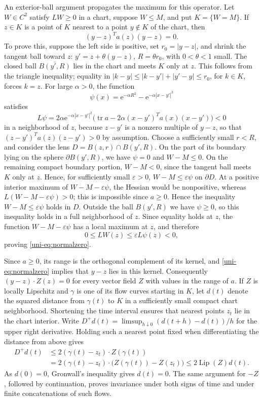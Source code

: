 An exterior-ball argument propagates the maximum for this operator.  Let $W\in C^2$
satisfy $LW\geq0$ in a chart, suppose $W\leq M$, and put
$K=\{W=M\}$.  If $z\in K$ is a point of $K$ nearest to a point $y\notin K$ of the chart, then
\begin{equation}\label{uni-eq:normalzero}
 (y-z)^Ta(z)(y-z)=0.
\end{equation}
To prove this, suppose the left side is positive, set
$r_0=|y-z|$, and shrink the tangent ball toward $z$:
$y'=z+\theta(y-z)$, $R=\theta r_0$, with $0<\theta<1$ small.
The closed ball $\overline{B(y',R)}$ lies in the chart and meets $K$
only at $z$.  This follows from the triangle inequality; equality in
$|k-y|\leq|k-y'|+|y'-y|\leq r_0$, for $k\in K$, forces $k=z$.
For large $\alpha>0$, the function
\[
 \psi(x)=\mathrm{e}^{-\alpha R^2}-\mathrm{e}^{-\alpha|x-y'|^2}
\]
satisfies
\[
 L\psi=2\alpha \mathrm{e}^{-\alpha|x-y'|^2}
   \bigl(\operatorname{tr}a-2\alpha(x-y')^Ta(x)(x-y')\bigr)<0
\]
in a neighborhood of $z$, because $z-y'$ is a nonzero multiple of $y-z$, so that $(z-y')^Ta(z)(z-y')>0$ by assumption.  Choose a sufficiently small $r<R$, and
consider the lens $D=B(z,r)\cap B(y',R)$.  On the part of its boundary lying on the
sphere $\partial B(y',R)$, we have $\psi=0$ and $W-M\leq0$.  On the remaining
compact boundary portion, $W-M<0$, since the tangent ball meets $K$
only at $z$.  Hence, for sufficiently small $\varepsilon>0$,
$W-M\leq\varepsilon\psi$ on $\partial D$.  At a positive interior
maximum of $W-M-\varepsilon\psi$, the Hessian would be nonpositive, whereas
$L(W-M-\varepsilon\psi)>0$; this is impossible since $a\geq0$.  Hence the
inequality $W-M\leq\varepsilon\psi$ holds in $D$.  Outside the ball $B(y',R)$ we have
$\psi\geq0$, so this inequality holds in a full neighborhood of $z$.
Since equality holds at $z$, the function $W-M-\varepsilon\psi$ has a local maximum at $z$, and therefore
\[
 0\leq LW(z)\leq\varepsilon L\psi(z)<0,
\]
proving \eqref{uni-eq:normalzero}.

Since $a\geq0$, its range is the orthogonal complement of its kernel, and
\eqref{uni-eq:normalzero} implies that $y-z$ lies in this kernel. Consequently
$(y-z)\cdot Z(z)=0$ for every vector field $Z$ with values in the range of $a$.  If $Z$ is locally
Lipschitz and $\gamma$ is one of its flow curves starting in $K$, let
$d(t)$ denote the squared distance from $\gamma(t)$ to $K$ in a sufficiently small
compact chart neighborhood.  Shortening the time interval ensures that
nearest points $z_t$ lie in the chart interior.  Write $D^+d(t)=\limsup_{h\downarrow0}(d(t+h)-d(t))/h$ for the upper right derivative. Holding such a nearest
point fixed when differentiating the distance from above gives
\begin{align*}
 D^+d(t)&\leq2(\gamma(t)-z_t)\cdot Z(\gamma(t))\\
 &=2(\gamma(t)-z_t)\cdot\bigl(Z(\gamma(t))-Z(z_t)\bigr)
 \leq2\operatorname{Lip}(Z)d(t).
\end{align*}
As $d(0)=0$, Gronwall's inequality gives $d(t)=0$.  The same argument
for $-Z$, followed by continuation, proves invariance under both signs
of time and under finite concatenations of such flows.

